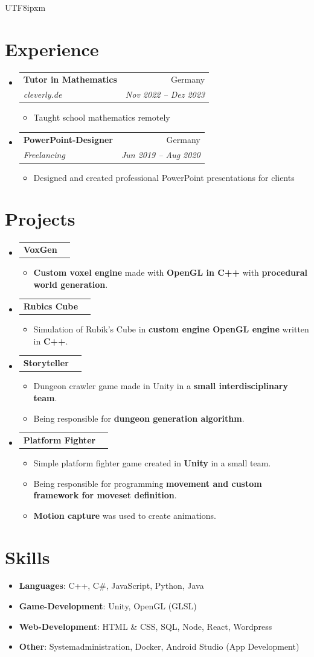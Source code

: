 \documentclass[letterpaper,11pt]{article}
\makeatletter
\newcommand{\resumeItem}[2]{
  \item\small{
    \textbf{#1}{: #2 \vspace{-2pt}}
  }
}
\newcommand{\resumePlainItem}[1]{
  \item\small{
    {#1 \vspace{-2pt}}
  }
}
\newcommand{\resumeSubheading}[4]{
  \vspace{-1pt}\item
    \begin{tabular*}{0.97\textwidth}[t]{l@{\extracolsep{\fill}}r}
      \textbf{#1} & #2 \\
      \textit{\small #3} & \textit{\small #4} \\
    \end{tabular*}\vspace{-5pt}
}
\newcommand{\resumePlainSubheading}[1]{
  \vspace{-1pt}\item
    \begin{tabular*}{0.97\textwidth}[t]{l@{\extracolsep{\fill}}r}
      \textbf{#1} \\
    \end{tabular*}\vspace{-5pt}
}
\newcommand{\resumeItemPlain}[1]{
  \item\small{
    {#1 \vspace{-2pt}}
  }
}
\newcommand{\resumeSubItem}[2]{\resumeItem{#1}{#2}\vspace{-4pt}}
\newcommand{\resumeSubHeadingListStart}{\begin{itemize}[leftmargin=*]}
\newcommand{\resumeSubHeadingListEnd}{\end{itemize}}
\newcommand{\resumeItemListStart}{\begin{itemize}}
\newcommand{\resumeItemListEnd}{\end{itemize}\vspace{-5pt}}
\makeatother
\begin{document}
\begin{CJK}{UTF8}{ipxm}
\section{Experience}
  \resumeSubHeadingListStart

    \resumeSubheading
      {Tutor in Mathematics}{Germany}
      {cleverly.de}{Nov 2022 -- Dez 2023}
      \resumeItemListStart
        \resumeItemPlain{Taught school mathematics remotely}
      \resumeItemListEnd

    \resumeSubheading
      {PowerPoint-Designer}{Germany}
      {Freelancing}{Jun 2019 -- Aug 2020}
      \resumeItemListStart
        \resumeItemPlain{Designed and created professional PowerPoint presentations for clients}
      \resumeItemListEnd

  \resumeSubHeadingListEnd


\section{Projects}
    \resumeSubHeadingListStart
    \resumePlainSubheading{VoxGen}{}
    \resumeItemListStart
      \resumePlainItem
        {\textbf{Custom voxel engine} made with \textbf{OpenGL in C++} with \textbf{procedural world generation}.}
    \resumeItemListEnd

    \resumePlainSubheading{Rubics Cube}
    \resumeItemListStart
      \resumePlainItem
        {Simulation of Rubik's Cube in \textbf{custom engine OpenGL engine} written in \textbf{C++}.}
    \resumeItemListEnd

    \resumePlainSubheading{Storyteller}
    \resumeItemListStart
      \resumePlainItem
        {Dungeon crawler game made in Unity in a \textbf{small interdisciplinary team}.}
      \resumePlainItem
        {Being responsible for \textbf{dungeon generation algorithm}.}
    \resumeItemListEnd

    \resumePlainSubheading{Platform Fighter}
    \resumeItemListStart
      \resumePlainItem
        {Simple platform fighter game created in \textbf{Unity} in a small team.}
      \resumePlainItem
        {Being responsible for programming \textbf{movement and custom framework for moveset definition}.}
      \resumePlainItem
        {\textbf{Motion capture} was used to create animations.}
    \resumeItemListEnd

  \resumeSubHeadingListEnd
  

%
\section{Skills}
 \resumeSubHeadingListStart
 \resumeSubItem{Languages}
   {C++, C\#, JavaScript, Python, Java}
    \resumeSubItem{Game-Development}
      {Unity, OpenGL (GLSL)}
    \resumeSubItem{Web-Development}
      {HTML \& CSS, SQL, Node, React, Wordpress}
    \resumeSubItem{Other}
      {Systemadministration, Docker, Android Studio (App Development)}
 \resumeSubHeadingListEnd


\end{CJK}
\end{document}
